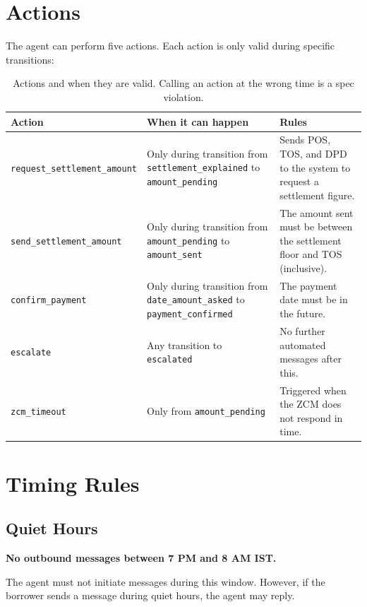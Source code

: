 \documentclass[11pt, a4paper]{article}
\begin{document}
\section{Actions}
\label{sec:actions}

The agent can perform five actions. Each action is only valid during specific transitions:

\begin{table}[h]
\centering
\begin{tabular}{lp{4cm}p{6cm}}
\toprule
\textbf{Action} & \textbf{When it can happen} & \textbf{Rules} \\
\midrule
\texttt{request\_settlement\_amount} & Only during transition from \texttt{settlement\_explained} to \texttt{amount\_pending} & Sends POS, TOS, and DPD to the system to request a settlement figure. \\
\texttt{send\_settlement\_amount} & Only during transition from \texttt{amount\_pending} to \texttt{amount\_sent} & The amount sent must be between the settlement floor and TOS (inclusive). \\
\texttt{confirm\_payment} & Only during transition from \texttt{date\_amount\_asked} to \texttt{payment\_confirmed} & The payment date must be in the future. \\
\texttt{escalate} & Any transition to \texttt{escalated} & No further automated messages after this. \\
\texttt{zcm\_timeout} & Only from \texttt{amount\_pending} & Triggered when the ZCM does not respond in time. \\
\bottomrule
\end{tabular}
\caption{Actions and when they are valid. Calling an action at the wrong time is a spec violation.}
\end{table}

\section{Timing Rules}
\label{sec:timing}

\subsection{Quiet Hours}

\textbf{No outbound messages between 7 PM and 8 AM IST.}

The agent must not initiate messages during this window. However, if the borrower sends a message during quiet hours, the agent may reply.
\end{document}
